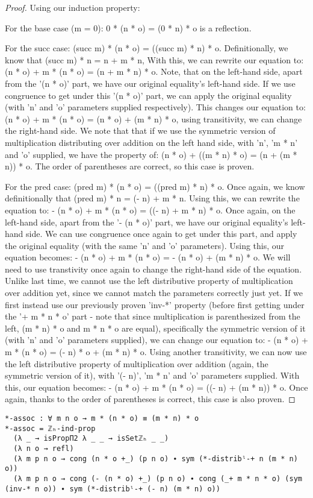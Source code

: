 \begin{proof}
  Using our induction property:

  For the base case (m = 0): 0 * (n * o) = (0 * n) * o is a reflection.

  For the succ case: (succ m) * (n * o) = ((succ m) * n) * o. Definitionally, we know that (succ m) * n = n + m * n, With this, we can rewrite our equation to: (n * o) + m * (n * o) = (n + m * n) * o. Note, that on the left-hand side, apart from the '(n * o)' part, we have our original equality's left-hand side. If we use congruence to get under this '(n * o)' part, we can apply the original equality (with 'n' and 'o' parameters supplied respectively). This changes our equation to: (n * o) + m * (n * o) = (n * o) + (m * n) * o, using transitivity, we can change the right-hand side. We note that that if we use the symmetric version of multiplication distributing over addition on the left hand side, with 'n', 'm * n' and 'o' supplied, we have the property of: (n * o) + ((m * n) * o) = (n + (m * n)) * o. The order of parentheses are correct, so this case is proven.

  For the pred case: (pred m) * (n * o) = ((pred m) * n) * o. Once again, we know definitionally that (pred m) * n = (- n) + m * n. Using this, we can rewrite the equation to: - (n * o) + m * (n * o) = ((- n) + m * n) * o. Once again, on the left-hand side, apart from the '- (n * o)' part, we have our original equality's left-hand side. We can use congruence once again to get under this part, and apply the original equality (with the same 'n' and 'o' parameters). Using this, our equation becomes: - (n * o) + m * (n * o) = - (n * o) + (m * n) * o. We will need to use transtivity once again to change the right-hand side of the equation. Unlike last time, we cannot use the left distributive property of multiplication over addition yet, since we cannot match the parameters correctly just yet. If we first instead use our previously proven 'inv-*' property (before first getting under the '+ m * n * o' part - note that since multiplication is parenthesized from the left, (m * n) * o and m * n * o are equal), specifically the symmetric version of it (with 'n' and 'o' parameters supplied), we can change our equation to: - (n * o) + m * (n * o) = (- n) * o + (m * n) * o. Using another transitivity, we can now use the left distributive property of multiplication over addition (again, the symmetric version of it), with '(- n)', 'm * n' and 'o' parameters supplied. With this, our equation becomes: - (n * o) + m * (n * o) = ((- n) + (m * n)) * o. Once again, thanks to the order of parentheses is correct, this case is also proven.
\end{proof}

\begin{listing}[H]
\begin{verbatim}
*-assoc : ∀ m n o → m * (n * o) ≡ (m * n) * o
*-assoc = ℤₕ-ind-prop
  (λ _ → isPropΠ2 λ _ _ → isSetℤₕ _ _)
  (λ n o → refl)
  (λ m p n o → cong (n * o +_) (p n o) ∙ sym (*-distribˡ-+ n (m * n) o))
  (λ m p n o → cong (- (n * o) +_) (p n o) ∙ cong (_+ m * n * o) (sym (inv-* n o)) ∙ sym (*-distribˡ-+ (- n) (m * n) o))
\end{verbatim}
\caption{Agda proof of multiplication being associative}
\end{listing}
